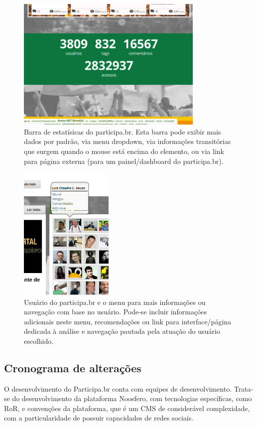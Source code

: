 \documentclass[12pt]{article}
\begin{document}
\begin{figure}[h!]
  \centering
      \includegraphics[width=0.8\textwidth]{screenshots/elp1}
  \caption{Barra de estatísicas do participa.br. Esta barra pode exibir mais dados por padrão, via menu dropdown, via informações transitórias que surgem quando o mouse está encima do elemento, ou via link para página externa (para um painel/dashboard do participa.br).}\label{fig:elp1}
\end{figure}

\begin{figure}[h!]
  \centering
      \includegraphics[width=0.4\textwidth]{screenshots/elp2}
  \caption{Usuário do participa.br e o menu para mais informações ou navegação com base no usuário. Pode-se incluir informações adicionais neste menu, recomendações ou link para interface/página dedicada à análise e navegação pautada pela atuação do usuário escolhido.}\label{fig:elp2}
\end{figure}



\subsection{Cronograma de alterações}\label{sec:cron}
O desenvolvimento do Participa.br conta com equipes de desenvolvimento. Trata-se do desenvolvimento da plataforma Noosfero, com tecnologias específicas, como RoR, e convenções da plataforma, que é um CMS de considerável complexidade, com a particularidade de possuir capacidades de redes sociais.
\end{document}
